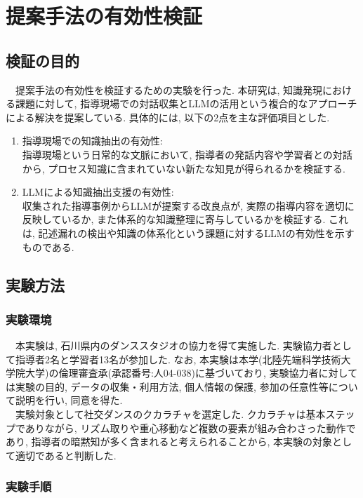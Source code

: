 \chapter{提案手法の有効性検証}

\section{検証の目的}
　提案手法の有効性を検証するための実験を行った. 本研究は, 知識発現\cite{Nishimura2017}における課題に対して, 指導現場での対話収集とLLMの活用という複合的なアプローチによる解決を提案している. 具体的には, 以下の2点を主な評価項目とした.\\
\begin{enumerate}
    \item 指導現場での知識抽出の有効性:\\
    指導現場という日常的な文脈において, 指導者の発話内容や学習者との対話から, プロセス知識に含まれていない新たな知見が得られるかを検証する. 
    \item LLMによる知識抽出支援の有効性:\\
    収集された指導事例からLLMが提案する改良点が, 実際の指導内容を適切に反映しているか, また体系的な知識整理に寄与しているかを検証する. これは, 記述漏れの検出や知識の体系化という課題に対するLLMの有効性を示すものである. 
\end{enumerate}


\section{実験方法}
\subsection{実験環境}
　本実験は, 石川県内のダンススタジオの協力を得て実施した. 実験協力者として指導者2名と学習者13名が参加した. なお, 本実験は本学(北陸先端科学技術大学院大学)の倫理審査承(承認番号:人04-038)に基づいており, 実験協力者に対しては実験の目的, データの収集・利用方法, 個人情報の保護, 参加の任意性等について説明を行い, 同意を得た. \\
　実験対象として社交ダンスのクカラチャを選定した. クカラチャは基本ステップでありながら, リズム取りや重心移動など複数の要素が組み合わさった動作であり, 指導者の暗黙知が多く含まれると考えられることから, 本実験の対象として適切であると判断した. \\


\subsection{実験手順}
